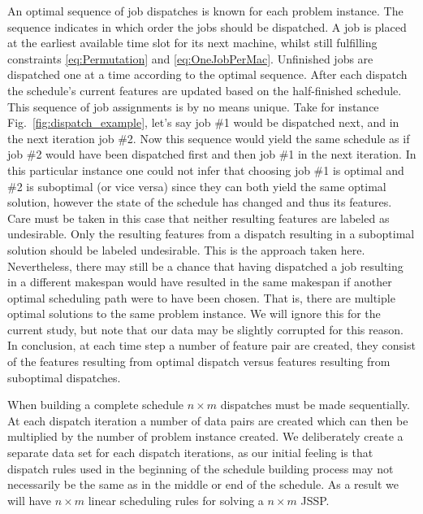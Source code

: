 \documentclass[10pt]{llncs}
\begin{document}
An optimal sequence of job dispatches is known for each problem instance. The sequence indicates in which order the jobs should be dispatched. 
A job is placed at the earliest available time slot for its next machine, whilst still fulfilling constraints \eqref{eq:Permutation} and \eqref{eq:OneJobPerMac}. 
Unfinished jobs are dispatched one at a time according to the optimal sequence. After each dispatch the schedule's current features are updated based on the half-finished schedule. This sequence of job assignments is by no means unique. Take for instance Fig.~\ref{fig:dispatch_example}, let's say job \#1 would be dispatched next, and in the next iteration job \#2. Now this sequence would yield the same schedule as if job \#2 would have been dispatched first and then job \#1 in the next iteration. In this particular instance one could not infer that choosing job \#1 is optimal and \#2 is suboptimal (or vice versa) since they can both yield the same optimal solution, however the state of the schedule has changed and thus its features. Care must be taken in this case that neither resulting features are labeled as undesirable. Only the resulting features from a dispatch resulting in a suboptimal solution should be labeled undesirable. This is the approach taken here. Nevertheless, there may still be a chance that having dispatched a job resulting in a different makespan would have resulted in the same makespan if another optimal scheduling path were to have been chosen. That is, there are multiple optimal solutions to the same problem instance. We will ignore this for the current study, but note that our data may be slightly corrupted for this reason. In conclusion, at each time step a number of feature pair are created, they consist of the features resulting from optimal dispatch versus features resulting from suboptimal dispatches.

When building a complete schedule $n\times m$ dispatches must be made sequentially. At each dispatch iteration a number of data pairs are created which can then be multiplied by the number of problem instance created. We deliberately create a separate data set for each dispatch iterations, as our initial feeling is that dispatch rules used in the beginning of the schedule building process may not necessarily be the same as in the middle or end of the schedule. As a result we will have $n\times m$ linear scheduling rules for solving a $n \times m$ JSSP.
\end{document}
